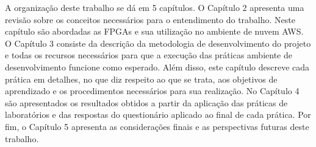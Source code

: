 A organização deste trabalho se dá em 5 capítulos. O Capítulo 2 apresenta uma revisão sobre os conceitos necessários para o entendimento do trabalho. Neste capítulo são abordadas as FPGAs e sua utilização no ambiente de nuvem AWS. O Capítulo 3 consiste da descrição da metodologia de desenvolvimento do projeto e todas os recursos necessários para que a execução das práticas ambiente de desenvolvimento funcione como esperado. Além disso, este capítulo descreve cada prática em detalhes, no que diz respeito ao que se trata, aos objetivos de aprendizado e os procedimentos necessários para sua realização. No Capítulo 4 são apresentados os resultados obtidos a partir da aplicação das práticas de laboratórios e das respostas do questionário aplicado ao final de cada prática. Por fim, o Capítulo 5 apresenta as considerações finais e as perspectivas futuras deste trabalho.





	

	
